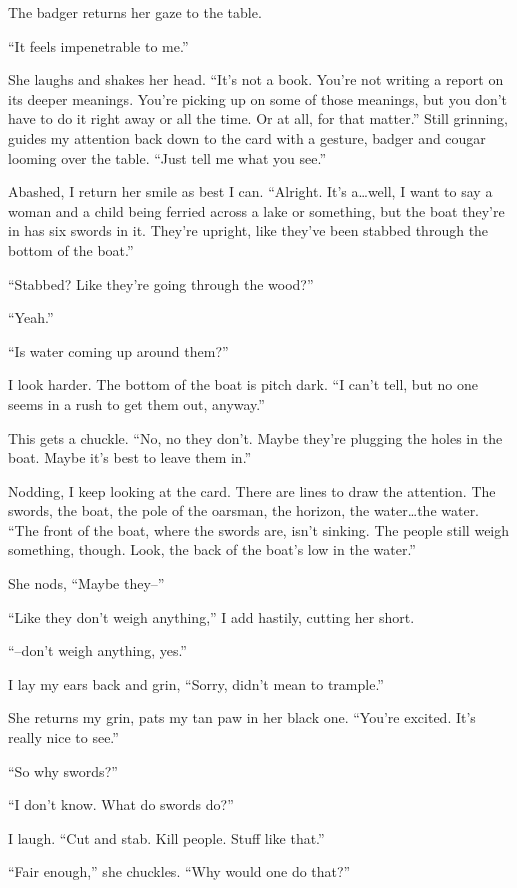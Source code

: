 The badger returns her gaze to the table.

``It feels impenetrable to me.''

She laughs and shakes her head. ``It's not a book. You're not writing a report on its deeper meanings. You're picking up on some of those meanings, but you don't have to do it right away or all the time. Or at all, for that matter.'' Still grinning, guides my attention back down to the card with a gesture, badger and cougar looming over the table. ``Just tell me what you see.''

Abashed, I return her smile as best I can. ``Alright. It's a\ldots{}well, I want to say a woman and a child being ferried across a lake or something, but the boat they're in has six swords in it. They're upright, like they've been stabbed through the bottom of the boat.''

``Stabbed? Like they're going through the wood?''

``Yeah.''

``Is water coming up around them?''

I look harder. The bottom of the boat is pitch dark. ``I can't tell, but no one seems in a rush to get them out, anyway.''

This gets a chuckle. ``No, no they don't. Maybe they're plugging the holes in the boat. Maybe it's best to leave them in.''

Nodding, I keep looking at the card. There are lines to draw the attention. The swords, the boat, the pole of the oarsman, the horizon, the water\ldots{}the water. ``The front of the boat, where the swords are, isn't sinking. The people still weigh something, though. Look, the back of the boat's low in the water.''

She nods, ``Maybe they--''

``Like they don't weigh anything,'' I add hastily, cutting her short.

``--don't weigh anything, yes.''

I lay my ears back and grin, ``Sorry, didn't mean to trample.''

She returns my grin, pats my tan paw in her black one. ``You're excited. It's really nice to see.''

``So why swords?''

``I don't know. What do swords do?''

I laugh. ``Cut and stab. Kill people. Stuff like that.''

``Fair enough,'' she chuckles. ``Why would one do that?''


